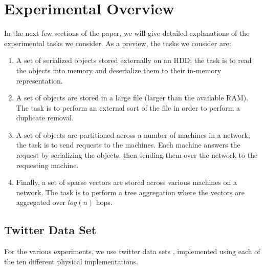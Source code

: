 \section{Experimental Overview}

In the next few sections of the paper, we will give detailed explanations of the experimental tasks we consider. As a preview, the tasks we consider are:

\begin{enumerate}
	\item A set of serialized objects stored externally on an HDD; the task is to read the objects into memory and deserialize them to their in-memory representation.
	\item A set of objects are stored in a large file (larger than the available RAM). The task is to perform an external sort of the file in order to perform a duplicate removal.
	\item A set of objects are partitioned across a number of machines in a network; the task is to send requests to the 	machines. Each machine answers the request by serializing the objects, then sending them over the network to the requesting machine.
	\item Finally, a set of sparse vectors are stored across various machines on a network. The task is to perform a tree aggregation where the vectors are aggregated over $log ( n )$
	hops.
\end{enumerate}

\subsection{Twitter Data Set}
For the various experiments, we use twitter data sets \cite{tweet_objects}, implemented using each of the ten different physical implementations. 

